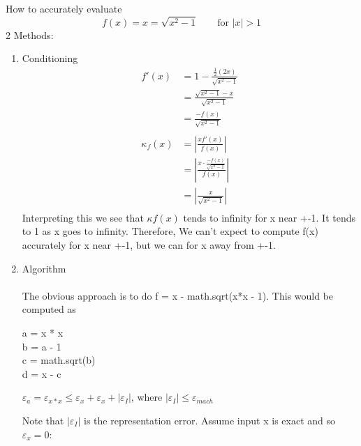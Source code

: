 \begin{example}
    How to accurately evaluate \[
        f(x) = x = \sqrt{x^2 - 1} \qquad \text{for } |x| > 1
    \]
    2 Methods:
    \begin{enumerate}
        \item Conditioning
              \begin{align*}
                  f'(x)
                   & = 1 - \frac{\frac{1}{2} (2x)}{\sqrt{x^2 - 1}}                      \\
                   & = \frac{\sqrt{x^2 - 1} - x}{\sqrt{x^2 - 1}}                        \\
                   & = \frac{-f(x)}{\sqrt{x^2 - 1}}                                     \\ \\
                  \kappa_f(x)
                   & = \left| \frac{x f'(x)}{f(x)} \right|                              \\
                   & = \left| \frac{x \cdot \frac{-f(x)}{\sqrt{x^2 - 1}}}{f(x)} \right| \\
                   & = \left| \frac{x}{\sqrt{x^2 - 1}} \right|                          \\
              \end{align*}
              Interpreting this we see that $\kappa{f(x)}$ tends to infinity for x near +-1.
              It tends to 1 as x goes to infinity. Therefore, We can't expect to compute f(x) accurately for x near +-1, but we can for x away from +-1.
        \item Algorithm \\ \\
              The obvious approach is to do f = x - math.sqrt(x*x - 1). This would be computed as
              \begin{center}
                  a = x * x \\
                  b = a - 1 \\
                  c = math.sqrt(b) \\
                  d = x - c \\
              \end{center}

              \( \varepsilon_a = \varepsilon_{x*x} \le \varepsilon_x + \varepsilon_x + |\varepsilon_I|\), where \( |\varepsilon_I| \le \varepsilon_{mach} \)

              Note that $|\varepsilon_I|$ is the representation error. Assume input x is exact and so $\varepsilon_x = 0$:


\end{enumerate}
\end{example}
